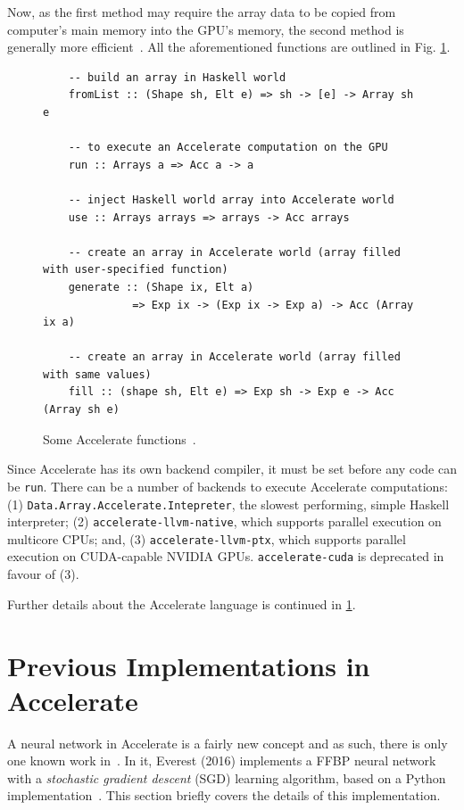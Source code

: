 Now, as the first method may require the array data to be copied from computer's main memory into the GPU's memory, the second method is generally more efficient~\cite{Mar13}. All the aforementioned functions are outlined in Fig. \ref{fig:acc-functions}.
\begin{figure}
  \begin{lstlisting}
    -- build an array in Haskell world
    fromList :: (Shape sh, Elt e) => sh -> [e] -> Array sh e

	-- to execute an Accelerate computation on the GPU
    run :: Arrays a => Acc a -> a
    
    -- inject Haskell world array into Accelerate world
    use :: Arrays arrays => arrays -> Acc arrays
    
    -- create an array in Accelerate world (array filled with user-specified function)
    generate :: (Shape ix, Elt a) 
              => Exp ix -> (Exp ix -> Exp a) -> Acc (Array ix a)
    
    -- create an array in Accelerate world (array filled with same values)
    fill :: (shape sh, Elt e) => Exp sh -> Exp e -> Acc (Array sh e)
  \end{lstlisting}
  \caption{Some Accelerate functions~\cite{Mar13}.}
  \label{fig:acc-functions}
\end{figure}

Since Accelerate has its own backend compiler, it must be set before any code can be \texttt{run}. There can be a number of backends to execute Accelerate computations: (1) \texttt{Data.Array.Accelerate.Intepreter}, the slowest performing, simple Haskell interpreter; (2) \texttt{accelerate-llvm-native}, which supports parallel execution on multicore CPUs; and, (3) \texttt{accelerate-llvm-ptx}, which supports parallel execution on CUDA-capable NVIDIA GPUs. \texttt{accelerate-cuda} is deprecated in favour of (3).

Further details about the Accelerate language is continued in \ref{se:previmplem}.

\section{Previous Implementations in Accelerate} \label{se:previmplem}

A neural network in Accelerate is a fairly new concept and as such, there is only one known work in~\cite{Eve16}. In it, Everest (2016) implements a FFBP neural network with a \textit{stochastic gradient descent} (SGD) learning algorithm, based on a Python implementation~\cite{Nie16}. This section briefly covers the details of this implementation.

